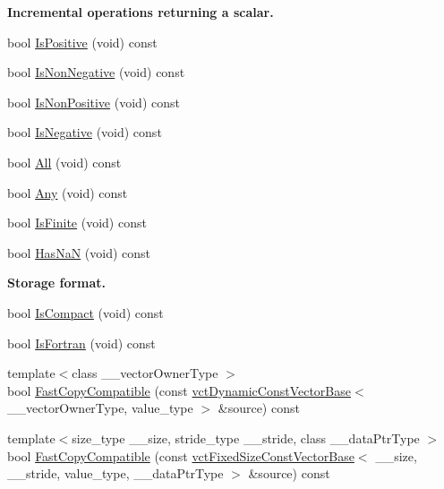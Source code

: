 \begin{Indent}{\bf Incremental operations returning a scalar.}
\begin{DoxyCompactItemize}
bool \hyperlink{classvct_dynamic_const_vector_base_afa738d3b70fab6576658c2d0b3399d76}{Is\+Positive} (void) const 
\item 
bool \hyperlink{classvct_dynamic_const_vector_base_ad3c77dc05ac42f1883dece974b0804b8}{Is\+Non\+Negative} (void) const 
\item 
bool \hyperlink{classvct_dynamic_const_vector_base_abbd8304a5570206280556783ed38491d}{Is\+Non\+Positive} (void) const 
\item 
bool \hyperlink{classvct_dynamic_const_vector_base_acf1de24b4e0a6de2a657b6a2293626a2}{Is\+Negative} (void) const 
\item 
bool \hyperlink{classvct_dynamic_const_vector_base_aca94793f67d96dd7faa5edb2476421c0}{All} (void) const 
\item 
bool \hyperlink{classvct_dynamic_const_vector_base_adcad9762e1574b3933f1a794ed67dcc3}{Any} (void) const 
\item 
bool \hyperlink{classvct_dynamic_const_vector_base_a2f013300bb42f8a0ed5c4e16d65d0e40}{Is\+Finite} (void) const 
\item 
bool \hyperlink{classvct_dynamic_const_vector_base_aa84128d614ab37d0fd9aa170a7980caa}{Has\+Na\+N} (void) const 
\end{DoxyCompactItemize}
\end{Indent}
\begin{Indent}{\bf Storage format.}\par
\begin{DoxyCompactItemize}
\item 
bool \hyperlink{classvct_dynamic_const_vector_base_adf8220a267124aebd67b2e2ff5dab9f1}{Is\+Compact} (void) const 
\item 
bool \hyperlink{classvct_dynamic_const_vector_base_a8cb2126c611a87542570c21d3fd10d56}{Is\+Fortran} (void) const 
\item 
{\footnotesize template$<$class \+\_\+\+\_\+vector\+Owner\+Type $>$ }\\bool \hyperlink{classvct_dynamic_const_vector_base_ae0593e26d75b25fbbb3d3405e08da405}{Fast\+Copy\+Compatible} (const \hyperlink{classvct_dynamic_const_vector_base}{vct\+Dynamic\+Const\+Vector\+Base}$<$ \+\_\+\+\_\+vector\+Owner\+Type, value\+\_\+type $>$ \&source) const 
\item 
{\footnotesize template$<$size\+\_\+type \+\_\+\+\_\+size, stride\+\_\+type \+\_\+\+\_\+stride, class \+\_\+\+\_\+data\+Ptr\+Type $>$ }\\bool \hyperlink{classvct_dynamic_const_vector_base_a1059821a74cb7870a831d858deff11d3}{Fast\+Copy\+Compatible} (const \hyperlink{classvct_fixed_size_const_vector_base}{vct\+Fixed\+Size\+Const\+Vector\+Base}$<$ \+\_\+\+\_\+size, \+\_\+\+\_\+stride, value\+\_\+type, \+\_\+\+\_\+data\+Ptr\+Type $>$ \&source) const 
\end{DoxyCompactItemize}
\end{Indent}
